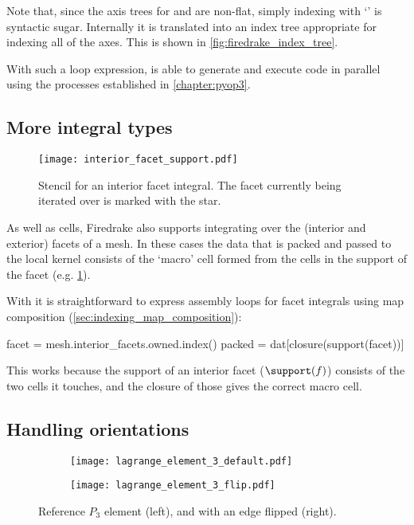 \documentclass[thesis]{subfiles}
\begin{document}
Note that, since the axis trees for  and  are non-flat, simply indexing with `' is syntactic sugar.
Internally it is translated into an index tree appropriate for indexing all of the axes.
This is shown in \cref{fig:firedrake_index_tree}.

With such a loop expression,  is able to generate and execute code in parallel using the processes established in \cref{chapter:pyop3}.

\subsection{More integral types}

\begin{figure}
  \centering
  \texttt{[image: interior\_facet\_support.pdf]}
  \caption{
    Stencil for an interior facet integral.
    The facet currently being iterated over is marked with the star.
  }
  \label{fig:interior_facet_support}
\end{figure}

As well as cells, Firedrake also supports integrating over the (interior and exterior) facets of a mesh.
In these cases the data that is packed and passed to the local kernel consists of the `macro' cell formed from the cells in the support of the facet (e.g. \cref{fig:interior_facet_support}).

With  it is straightforward to express assembly loops for facet integrals using map composition (\cref{sec:indexing_map_composition}):
\begin{pyinline}
  facet = mesh.interior_facets.owned.index()
  packed = dat[closure(support(facet))]
\end{pyinline}
This works because the support of an interior facet ($\support(f)$) consists of the two cells it touches, and the closure of those gives the correct macro cell.

\subsection{Handling orientations}

\begin{figure}
  \centering
  \begin{subfigure}{0.45\textwidth}
    \centering
    \texttt{[image: lagrange\_element\_3\_default.pdf]}
  \end{subfigure}
  \begin{subfigure}{0.45\textwidth}
    \centering
    \texttt{[image: lagrange\_element\_3\_flip.pdf]}
  \end{subfigure}
  \caption{Reference $P_3$ element (left), and with an edge flipped (right).}
  \label{fig:element_orientation_permute}
\end{figure}
\end{document}
